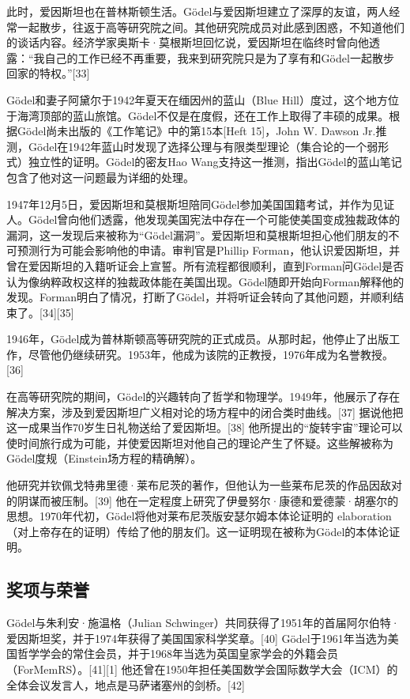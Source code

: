 此时，爱因斯坦也在普林斯顿生活。Gödel与爱因斯坦建立了深厚的友谊，两人经常一起散步，往返于高等研究院之间。其他研究院成员对此感到困惑，不知道他们的谈话内容。经济学家奥斯卡·莫根斯坦回忆说，爱因斯坦在临终时曾向他透露：“我自己的工作已经不再重要，我来到研究院只是为了享有和Gödel一起散步回家的特权。”[33]

Gödel和妻子阿黛尔于1942年夏天在缅因州的蓝山（Blue Hill）度过，这个地方位于海湾顶部的蓝山旅馆。Gödel不仅是在度假，还在工作上取得了丰硕的成果。根据Gödel尚未出版的《工作笔记》中的第15本[Heft 15]，John W. Dawson Jr.推测，Gödel在1942年蓝山时发现了选择公理与有限类型理论（集合论的一个弱形式）独立性的证明。Gödel的密友Hao Wang支持这一推测，指出Gödel的蓝山笔记包含了他对这一问题最为详细的处理。

1947年12月5日，爱因斯坦和莫根斯坦陪同Gödel参加美国国籍考试，并作为见证人。Gödel曾向他们透露，他发现美国宪法中存在一个可能使美国变成独裁政体的漏洞，这一发现后来被称为“Gödel漏洞”。爱因斯坦和莫根斯坦担心他们朋友的不可预测行为可能会影响他的申请。审判官是Phillip Forman，他认识爱因斯坦，并曾在爱因斯坦的入籍听证会上宣誓。所有流程都很顺利，直到Forman问Gödel是否认为像纳粹政权这样的独裁政体能在美国出现。Gödel随即开始向Forman解释他的发现。Forman明白了情况，打断了Gödel，并将听证会转向了其他问题，并顺利结束了。[34][35]

1946年，Gödel成为普林斯顿高等研究院的正式成员。从那时起，他停止了出版工作，尽管他仍继续研究。1953年，他成为该院的正教授，1976年成为名誉教授。[36]

在高等研究院的期间，Gödel的兴趣转向了哲学和物理学。1949年，他展示了存在解决方案，涉及到爱因斯坦广义相对论的场方程中的闭合类时曲线。[37] 据说他把这一成果当作70岁生日礼物送给了爱因斯坦。[38] 他所提出的“旋转宇宙”理论可以使时间旅行成为可能，并使爱因斯坦对他自己的理论产生了怀疑。这些解被称为Gödel度规（Einstein场方程的精确解）。

他研究并钦佩戈特弗里德·莱布尼茨的著作，但他认为一些莱布尼茨的作品因敌对的阴谋而被压制。[39] 他在一定程度上研究了伊曼努尔·康德和爱德蒙·胡塞尔的思想。1970年代初，Gödel将他对莱布尼茨版安瑟尔姆本体论证明的 elaboration（对上帝存在的证明）传给了他的朋友们。这一证明现在被称为Gödel的本体论证明。
\subsection{奖项与荣誉}  
Gödel与朱利安·施温格（Julian Schwinger）共同获得了1951年的首届阿尔伯特·爱因斯坦奖，并于1974年获得了美国国家科学奖章。[40] Gödel于1961年当选为美国哲学学会的常住会员，并于1968年当选为英国皇家学会的外籍会员（ForMemRS）。[41][1] 他还曾在1950年担任美国数学会国际数学大会（ICM）的全体会议发言人，地点是马萨诸塞州的剑桥。[42]
